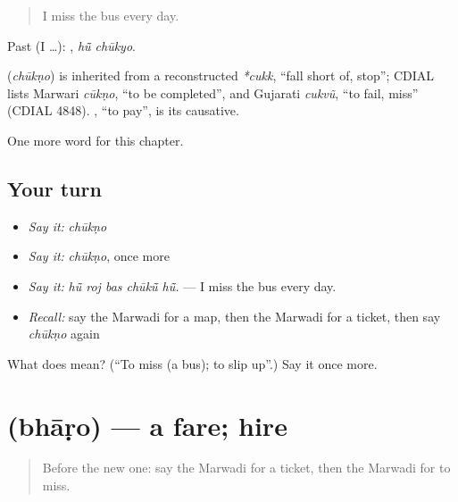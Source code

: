 \begin{quote}
I miss the bus every day.
\end{quote}

Past (I …):  , \emph{hū̃ chūkyo}.

\begin{cousinweb}
\textbf{} (\emph{chūkṇo}) is inherited from a reconstructed \emph{*cukk}, \textquotedblleft{}fall short of, stop\textquotedblright{}; CDIAL lists Marwari \emph{cūkṇo}, \textquotedblleft{}to be completed\textquotedblright{}, and Gujarati \emph{cukvũ}, \textquotedblleft{}to fail, miss\textquotedblright{} (CDIAL 4848). \textbf{}, \textquotedblleft{}to pay\textquotedblright{}, is its causative.
\end{cousinweb}

\begin{grammarlens}[title={What you've built}]
One more word for this chapter.
\end{grammarlens}

\subsection*{Your turn}
\begin{itemize}
\raggedright
  \item \emph{Say it:} \emph{chūkṇo}
  \item \emph{Say it:} \emph{chūkṇo}, once more
  \item \emph{Say it:} \emph{hū̃ roj bas chūkū̃ hū̃.} — I miss the bus every day.
  \item \emph{Recall:} say the Marwadi for a map, then the Marwadi for a ticket, then say \emph{chūkṇo} again
\end{itemize}

\begin{tcolorbox}[breakable,colback=teal!4,colframe=teal!35!black,title={Before you move on}]
What does  mean? (\textquotedblleft{}To miss (a bus); to slip up\textquotedblright{}.) Say it once more.
\end{tcolorbox}
\section[\texorpdfstring{\mw{भाड़ो} (bhāṛo)}{भाड़ो (bhāṛo)}]{ (bhāṛo) — a fare; hire}

\label{lesson:MW-C205-bharo}



\begin{quote}
Before the new one: say the Marwadi for a ticket, then the Marwadi for to miss.
\end{quote}

